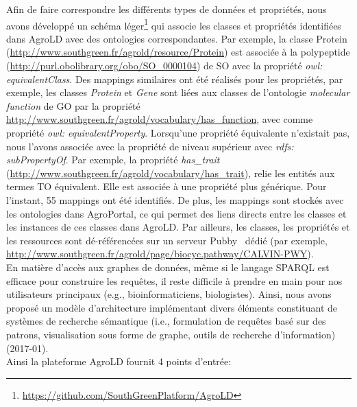 Afin de faire correspondre les différents types de données et propriétés, nous avons développé un schéma léger\footnote{\url{https://github.com/SouthGreenPlatform/AgroLD}} qui associe les classes et propriétés identifiées dans AgroLD avec des ontologies correspondantes. Par exemple, la classe Protein (\url{http://www.southgreen.fr/agrold/resource/Protein}) est associée à la polypeptide (\url{http://purl.obolibrary.org/obo/SO\_0000104}) de SO avec la propriété \textit{owl: equivalentClass}. Des mappings similaires ont été réalisés pour les propriétés, par exemple, les classes \textit{Protein} et \textit{Gene} sont liées aux classes de l'ontologie \textit{molecular function} de GO par la propriété \url{http://www.southgreen.fr/agrold/vocabulary/has\_function}, avec comme propriété \textit{owl: equivalentProperty}. Lorsqu'une propriété équivalente n'existait pas, nous l'avons associée avec la propriété de niveau supérieur avec \textit{rdfs: subPropertyOf}. Par exemple, la propriété \textit{has\_trait} (\url{http://www.southgreen.fr/agrold/vocabulary/has\_trait}), relie les entités aux termes TO équivalent. Elle est associée à une propriété plus générique. Pour l'instant, 55 mappings ont été identifiés. De plus, les mappings sont stockés avec les ontologies dans AgroPortal, ce qui permet des liens directs entre les classes et les instances de ces classes dans AgroLD. Par ailleurs, les classes, les propriétés et les ressources sont dé-référencées sur un serveur Pubby~\cite{pubby} dédié (par exemple, \url{http://www.southgreen.fr/agrold/page/biocyc.pathway/CALVIN-PWY}).\\


En matière d’accès aux graphes de données, même si le langage SPARQL est efficace pour construire les requêtes, il reste difficile à prendre en main pour nos utilisateurs principaux (e.g., bioinformaticiens, biologistes). Ainsi, nous avons proposé un modèle d'architecture implémentant divers éléments constituant de systèmes de recherche sémantique (i.e., formulation de requêtes basé sur des patrons, visualisation sous forme de graphe, outils de recherche d’information) (2017-01).\\
Ainsi la plateforme AgroLD fournit 4 points d'entrée:\\

